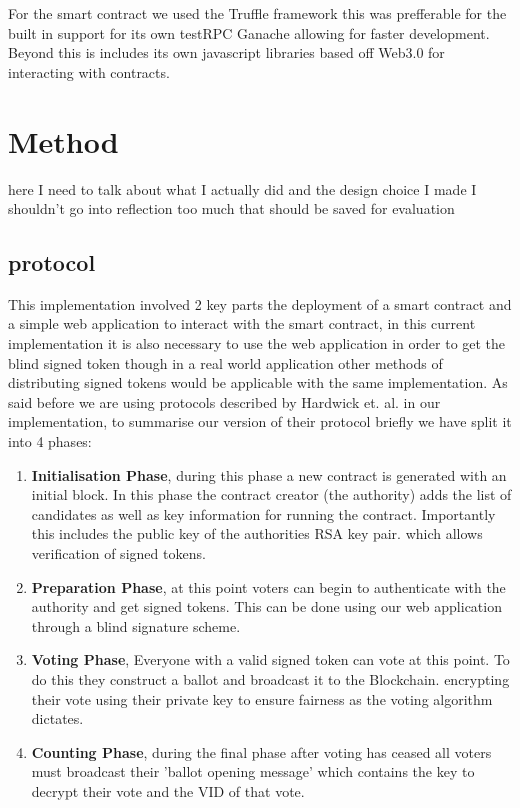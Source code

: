 \documentclass{entcs}
\begin{document}
For the smart contract we used the Truffle framework this was prefferable for the built in support for its own testRPC Ganache allowing for faster development. Beyond this is includes its own javascript libraries based off Web3.0 for interacting with contracts.

\section{Method}
here I need to talk about what I actually did and the design choice I made I shouldn't go into reflection too much that should be saved for evaluation

\subsection{protocol}
This implementation involved 2 key parts the deployment of a smart contract and a simple web application to interact with the smart contract, in this current implementation it is also necessary to use the web application in order to get the blind signed token though in a real world application other methods of distributing signed tokens would be applicable with the same implementation.
As said before we are using protocols described by Hardwick et. al. in our implementation, to summarise our version of their protocol briefly we have split it into 4 phases:
\begin{enumerate}
    \item \textbf{Initialisation Phase}, during this phase a new contract is generated with an initial block. In this phase the contract creator (the authority) adds the list of candidates as well as key information for running the contract. Importantly this includes the public key of the authorities RSA key pair. which allows verification of signed tokens.
    \item \textbf{Preparation Phase}, at this point voters can begin to authenticate with the authority and get signed tokens. This can be done using our web application through a blind signature scheme.
    \item \textbf{Voting Phase}, Everyone with a valid signed token can vote at this point. To do this they construct a ballot and broadcast it to the Blockchain. encrypting their vote using their private key to ensure fairness as the voting algorithm dictates.
    \item \textbf{Counting Phase}, during the final phase after voting has ceased all voters must broadcast their 'ballot opening message' which contains the key to decrypt their vote and the VID of that vote.
\end{enumerate}
\end{document}
